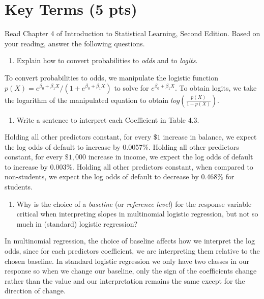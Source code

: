 \documentclass[
]{article}
\providecommand{\tightlist}{%
  \setlength{\itemsep}{0pt}\setlength{\parskip}{0pt}}
\begin{document}
\hypertarget{key-terms-5-pts}{%
\section{Key Terms (5 pts)}\label{key-terms-5-pts}}

Read Chapter 4 of Introduction to Statistical Learning, Second Edition.
Based on your reading, answer the following questions.

\begin{enumerate}
\def\labelenumi{\arabic{enumi}.}
\tightlist
\item
  Explain how to convert probabilities to \emph{odds} and to
  \emph{logits}.
\end{enumerate}

To convert probabilities to odds, we manipulate the logistic function
\(p(X) = e^{\beta_0 + \beta_1X}/(1 + e^{\beta_0 + \beta_1X})\) to solve
for \(e^{\beta_0 + \beta_1X}\). To obtain logits, we take the logarithm
of the manipulated equation to obtain \(log(\frac{p(X)}{1 - p(X)})\).

\begin{enumerate}
\def\labelenumi{\arabic{enumi}.}
\setcounter{enumi}{1}
\tightlist
\item
  Write a sentence to interpret each Coefficient in Table 4.3.
\end{enumerate}

Holding all other predictors constant, for every \(\$1\) increase in
balance, we expect the log odds of default to increase by 0.0057\%.
Holding all other predictors constant, for every \(\$1,000\) increase in
income, we expect the log odds of default to increase by 0.003\%.
Holding all other predictors constant, when compared to non-students, we
expect the log odds of default to decrease by 0.468\% for students.

\begin{enumerate}
\def\labelenumi{\arabic{enumi}.}
\setcounter{enumi}{2}
\tightlist
\item
  Why is the choice of a \emph{baseline} (or \emph{reference level}) for
  the response variable critical when interpreting slopes in multinomial
  logistic regression, but not so much in (standard) logistic
  regression?
\end{enumerate}

In multinomial regression, the choice of baseline affects how we
interpret the log odds, since for each predictors coefficient, we are
interpreting them relative to the chosen baseline. In standard logistic
regression we only have two classes in our response so when we change
our baseline, only the sign of the coefficients change rather than the
value and our interpretation remains the same except for the direction
of change.
\end{document}
